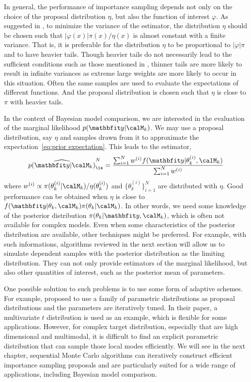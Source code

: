 In general, the performance of importance sampling depends not only on the
choice of the proposal distribution $\eta$, but also the function of interest
$\varphi$. As suggested in \cite[][sec.~3.3.2]{Robert:2004tn}, to minimize the
variance of the estimator, the distribution $\eta$ should be chosen such that
$|\varphi(x)|\pi(x)/\eta(x)$ is almost constant with a finite variance. That
is, it is preferable for the distribution $\eta$ to be proportional to
$|\varphi|\pi$ and to have heavier tails. Though heavier tails do not
necessarily lead to the sufficient conditions such as those mentioned in
\cite{Geweke:1989tm}, thinner tails are more likely to result in infinite
variances as extreme large weights are more likely to occur in this situation.
Often the same samples are used to evaluate the expectations of different
functions. And the proposal distribution is chosen such that $\eta$ is close
to $\pi$ with heavier tails.

In the context of Bayesian model comparison, we are interested in the
evaluation of the marginal likelihood $p(\data|\calM_k)$. We may use a
proposal distribution, say $\eta$ and samples drawn from it to approximate the
expectation~\eqref{eq:prior expectation}. This leads to the estimator,
\begin{equation}
  \widehat{p(\data|\calM_k)}_{\is}^N =
  \frac{\sum_{i=1}^N w^{(i)} f(\data|\theta_k^{(i)},\calM_k)}
  {\sum_{i=1}^N w^{(i)}}
\end{equation}
where $w^{(i)}\propto\pi(\theta_k^{(i)}|\calM_k)/\eta(\theta_k^{(i)})$ and
$\{\theta_k^{(i)}\}_{i=1}^N$ are distributed with $\eta$. Good performance can
be obtained when $\eta$ is close to
$f(\data|\theta_k,\calM_k)\pi(\theta_k|\calM_k)$. In other words, we need some
knowledge of the posterior distribution $\pi(\theta_k|\data,\calM_k)$, which
is often not available for complex models. Even when some characteristics of
the posterior distribution are available, other techniques might be preferred.
For example, with such informations, algorithms reviewed in the next section
will allow us to simulate dependent samples with the posterior distribution as
the limiting distribution. They can not only provide estimators of the
marginal likelihood, but also other quantities of interest, such as the
posterior mean of parameters.

One possible solution to such problems is to use some form of adaptive
schemes. For example, \cite{ManSuk:1992vx} proposed to use a family of
parametric distributions as proposal distributions and the parameters are
iteratively tuned. In their paper, a multivariate $t$ distribution is used as
an example, which is flexible for some applications. However, for complex
target distribution, especially that are high dimensional and multimodal, it
is difficult to find an explicit parametric distribution that can sample those
local modes efficiently. We will see in the next chapter, sequential Monte
Carlo algorithms can iteratively construct efficient importance sampling
proposals and are particularly suited for a wide range of applications,
including Bayesian model comparison.

